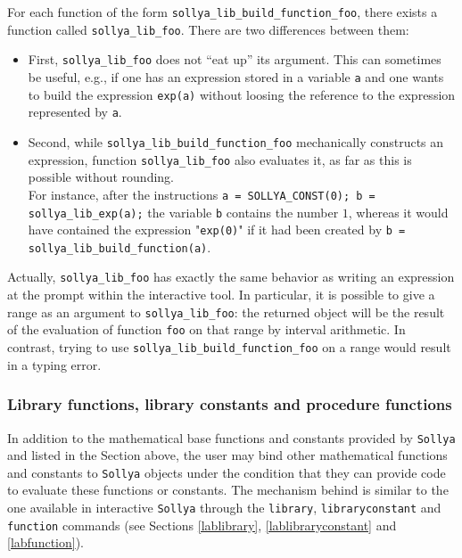 \documentclass[a4paper]{article}
\newcommand{\sollya}{\texttt{Sollya}\xspace}
\begin{document}
For each function of the form \verb|sollya_lib_build_function_foo|, there exists a function called \verb|sollya_lib_foo|. There are two differences between them:
\begin{itemize}
\item First, \verb|sollya_lib_foo| does not ``eat up'' its argument. This can sometimes be useful, e.g., if one has an expression stored in a variable \texttt{a} and one wants to build the expression \texttt{exp(a)} without loosing the reference to the expression represented by \texttt{a}.
\item Second, while \verb|sollya_lib_build_function_foo| mechanically constructs an expression, function \verb|sollya_lib_foo| also evaluates it, as far as this is possible without rounding.\\
For instance, after the instructions \verb|a = SOLLYA_CONST(0); b = sollya_lib_exp(a);| the variable \texttt{b} contains the number $1$, whereas it would have contained the expression "\texttt{exp(0)}" if it had been created by \verb|b = sollya_lib_build_function(a)|.
\end{itemize}
Actually, \verb|sollya_lib_foo| has exactly the same behavior as writing an expression at the prompt within the interactive tool. In particular, it is possible to give a range as an argument to \verb|sollya_lib_foo|: the returned object will be the result of the evaluation of function \verb|foo| on that range by interval arithmetic. In contrast, trying to use \verb|sollya_lib_build_function_foo| on a range would result in a typing error.

\subsubsection{Library functions, library constants and procedure functions}

In addition to the mathematical base functions and constants provided
by \sollya and listed in the Section above, the user may bind other
mathematical functions and constants to \sollya objects under the
condition that they can provide code to evaluate these functions or
constants. The mechanism behind is similar to the one available in
interactive \sollya through the {\tt library}, {\tt libraryconstant}
and {\tt function} commands (see Sections \ref{lablibrary},
\ref{lablibraryconstant} and \ref{labfunction}).
\end{document}
